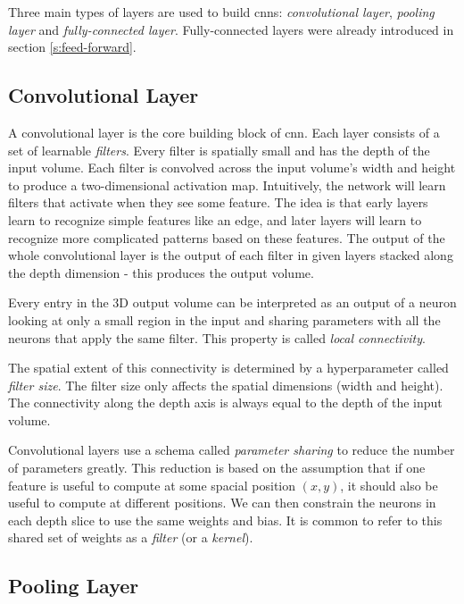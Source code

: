Three main types of layers are used to build \glspl{cnn}: \textit{convolutional layer}, \textit{pooling layer} and \textit{fully-connected layer}. Fully-connected layers were already introduced in section \ref{s:feed-forward}.

\subsection{Convolutional Layer}

A convolutional layer is the core building block of \gls{cnn}. Each layer consists of a set of learnable \textit{filters}. Every filter is spatially small and has the depth of the input volume. Each filter is convolved across the input volume's width and height to produce a two-dimensional activation map. Intuitively, the network will learn filters that activate when they see some feature. The idea is that early layers learn to recognize simple features like an edge, and later layers will learn to recognize more complicated patterns based on these features. The output of the whole convolutional layer is the output of each filter in given layers stacked along the depth dimension - this produces the output volume. 

Every entry in the 3D output volume can be interpreted as an output of a neuron looking at only a small region in the input and sharing parameters with all the neurons that apply the same filter. This property is called \textit{local connectivity}.

The spatial extent of this connectivity is determined by a hyperparameter called \textit{filter size}. The filter size only affects the spatial dimensions (width and height). The connectivity along the depth axis is always equal to the depth of the input volume.

Convolutional layers use a schema called \textit{parameter sharing} to reduce the number of parameters greatly. This reduction is based on the assumption that if one feature is useful to compute at some spacial position $(x,y)$, it should also be useful to compute at different positions. We can then constrain the neurons in each depth slice to use the same weights and bias. It is common to refer to this shared set of weights as a \textit{filter} (or a \textit{kernel}).

\subsection{Pooling Layer}

